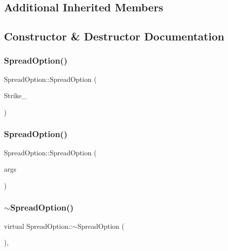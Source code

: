 \subsection*{Additional Inherited Members}


\subsection{Constructor \& Destructor Documentation}
\hypertarget{classSpreadOption_a12358b27158d510959c511273cec4cfc}{}\label{classSpreadOption_a12358b27158d510959c511273cec4cfc} 
\subsubsection{\texorpdfstring{Spread\+Option()}{SpreadOption()}\hspace{0.1cm}{\footnotesize\ttfamily [1/2]}}
{\footnotesize\ttfamily Spread\+Option\+::\+Spread\+Option (\begin{DoxyParamCaption}\item[{double}]{Strike\+\_\+ }\end{DoxyParamCaption})}

\hypertarget{classSpreadOption_ad2c9642951b84671594320041630978f}{}\label{classSpreadOption_ad2c9642951b84671594320041630978f} 
\subsubsection{\texorpdfstring{Spread\+Option()}{SpreadOption()}\hspace{0.1cm}{\footnotesize\ttfamily [2/2]}}
{\footnotesize\ttfamily Spread\+Option\+::\+Spread\+Option (\begin{DoxyParamCaption}\item[{const \hyperlink{classMJArray}{M\+J\+Array} \&}]{args }\end{DoxyParamCaption})}

\hypertarget{classSpreadOption_a78620ae17e4161d02ae89adcb27c8571}{}\label{classSpreadOption_a78620ae17e4161d02ae89adcb27c8571} 
\subsubsection{\texorpdfstring{$\sim$\+Spread\+Option()}{~SpreadOption()}}
{\footnotesize\ttfamily virtual Spread\+Option\+::$\sim$\+Spread\+Option (\begin{DoxyParamCaption}{ }\end{DoxyParamCaption})\hspace{0.3cm}{\ttfamily [inline]}, {\ttfamily [virtual]}}



